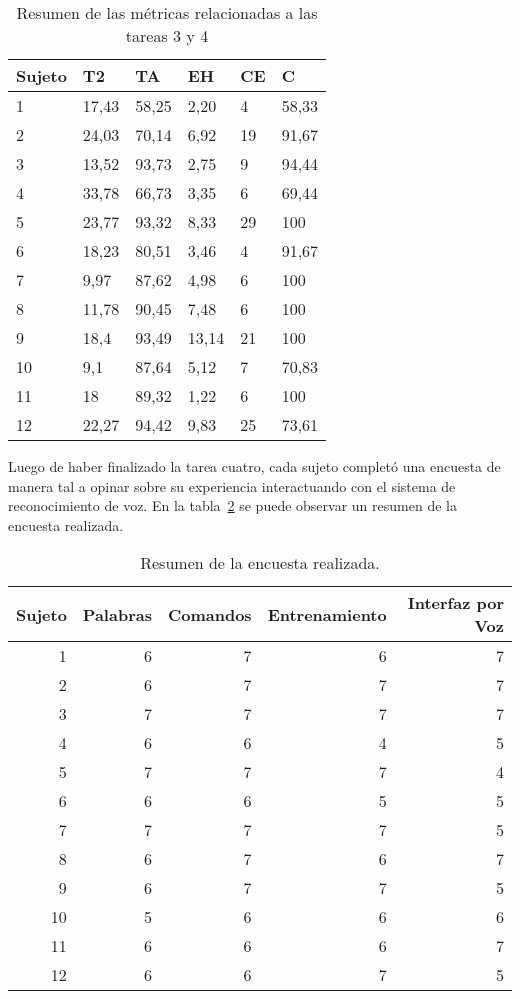 \begin{table}[H]
\centering
\footnotesize
\begin{tabular}{|p{1.6cm}|p{1.6cm}|p{1.6cm}|p{1.6cm}|p{1.6cm}|p{1.6cm}|}
\hline
    Sujeto & T2 & TA   &  EH  & CE &  C\\
    \hline 
    1  & 17,43 & 58,25 & 2,20  & 4  & 58,33 \\
    2  & 24,03 & 70,14 & 6,92  & 19 & 91,67 \\
    3  & 13,52 & 93,73 & 2,75  & 9  & 94,44 \\
    4  & 33,78 & 66,73 & 3,35  & 6  & 69,44 \\
    5  & 23,77 & 93,32 & 8,33  & 29 & 100   \\
    6  & 18,23 & 80,51 & 3,46  & 4  & 91,67 \\
    7  & 9,97  & 87,62 & 4,98  & 6  & 100   \\
    8  & 11,78 & 90,45 & 7,48  & 6  & 100   \\
    9  & 18,4  & 93,49 & 13,14 & 21 & 100   \\
    10 & 9,1   & 87,64 & 5,12  & 7  & 70,83 \\
    11 & 18    & 89,32 & 1,22  & 6  & 100   \\
    12 & 22,27 & 94,42 & 9,83  & 25 & 73,61 \\
\hline
\end{tabular}
\caption{Resumen de las m\'etricas relacionadas a las tareas 3 y 4}
\label{sec:tabla-metricas-t4}
\end{table}


Luego de haber finalizado la tarea cuatro, cada sujeto complet\'o una encuesta de manera tal a
opinar sobre su experiencia interactuando con el sistema de reconocimiento de voz. En la tabla~\ref{sec:tabla-encuesta}
se puede observar un resumen de la encuesta realizada.


\begin{table}[H] 
\centering
\footnotesize
\begin{tabular}{|r|r|r|r|r|}
\hline
    Sujeto & Palabras & Comandos & Entrenamiento & Interfaz por Voz \\
    \hline
    1 & 6 & 7 & 6 & 7 \\
    2 & 6 & 7 & 7 & 7 \\
    3 & 7 & 7 & 7 & 7 \\
    4 & 6 & 6 & 4 & 5 \\
    5 & 7 & 7 & 7 & 4 \\
    6 & 6 & 6 & 5 & 5 \\
    7 & 7 & 7 & 7 & 5 \\
    8 & 6 & 7 & 6 & 7  \\
    9 & 6 & 7 & 7 & 5  \\
    10 & 5 & 6 & 6 & 6  \\
    11 & 6 & 6 & 6 & 7  \\
    12 & 6 & 6 & 7 & 5  \\
\hline
\end{tabular}
\caption{Resumen de la encuesta realizada.}
\label{sec:tabla-encuesta}
\end{table}

